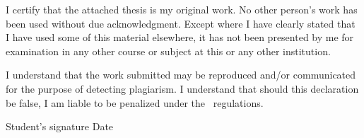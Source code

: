 I certify that the attached thesis is my original work. No other person's work has been used without due acknowledgment. Except where I have clearly stated that I have used some of this material elsewhere, it has not been presented by me for examination in any other course or subject at this or any other institution.

I understand that the work submitted may be reproduced and/or communicated for the purpose of detecting plagiarism. I understand that should this declaration be false, I am liable to be penalized under the \universityName\ regulations.

\vfil

\newcommand{\textAndPlace}[2]{#1\hspace{0.5cm}\makebox[#2]{\hrulefill}}
{\raggedleft
	\textAndPlace{Student's signature}{1.8in}
	\hspace{0.5cm}
	\textAndPlace{Date}{1.2in}\par
}

